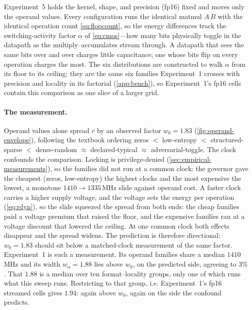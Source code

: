 \documentclass{article}
\theoremstyle{plain}
\theoremstyle{definition}
\theoremstyle{remark}
\begin{document}
Experiment~5 holds the kernel, shape,
and precision (fp16) fixed and moves only the operand values. Every
configuration runs the identical matmul $A\,B$ with the identical operation
count \cref{eq:flopcount}, so the energy differences track the
switching-activity factor $\alpha$ of \cref{eq:cmos}---how many bits
physically toggle in the datapath as the multiply--accumulates stream
through. A datapath that sees the
same bits over and over charges little capacitance; one whose bits flip on
every operation charges the most. The six distributions are constructed to
walk $\alpha$ from its floor to its ceiling; they are the same six families
Experiment~1 crosses with precision and locality in its factorial
(\cref{app:bench}), so Experiment~1's fp16 cells contain this comparison as
one slice of a larger grid.

\paragraph{The measurement.}
Operand values alone spread $r$ by an observed factor
$w_0 = 1.83$ (\cref{fig:operand-envelope}), following the textbook ordering
zeros $<$ low-entropy $<$ structured-sparse $<$ dense-random $\approx$
declared-typical $\approx$ adversarial-toggle. The clock confounds the comparison.
Locking is privilege-denied (\cref{sec:empirical-measurements}), so the families
did not run at a common clock: the governor gave the cheapest (zeros, low-entropy)
the highest clocks and the most expensive the lowest, a monotone
$1410 \to 1335$\,MHz slide against operand cost. A faster clock carries a higher
supply voltage, and the voltage sets the energy per operation (\cref{eq:rdyn}),
so the slide squeezed the spread from both ends: the cheap families paid a
voltage premium that raised the floor, and the expensive families ran at a
voltage discount that lowered the ceiling. At one common clock both effects
disappear and the spread widens. The prediction is therefore directional:
$w_0 = 1.83$ should sit below a matched-clock measurement of the same factor.
Experiment~1 is such a measurement. Its operand families share a median
$1410$\,MHz and its width $w_\alpha = 1.88$ lies above $w_0$, on the predicted
side, agreeing to $3\%$. That $1.88$ is a median over ten format--locality
groups, only one of which runs what this sweep runs. Restricting to that
group, i.e. Experiment~1's fp16 streamed cells gives $1.94$: again above $w_0$,
again on the side the confound predicts.
\end{document}
